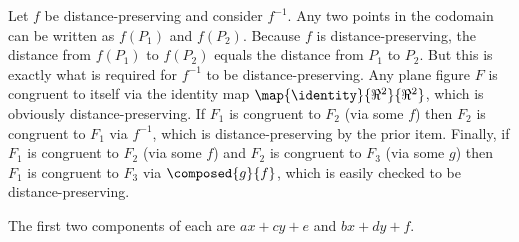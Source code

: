 \begin{ans}{3}
       \begin{exparts}
         \partsitem Let $f$ be distance-preserving and consider $f^{-1}$.
           Any two points in the codomain can be written as $f(P_1)$ and
           $f(P_2)$.
           Because $f$ is distance-preserving, the distance from $f(P_1)$
           to $f(P_2)$ equals the distance from $P_1$ to $P_2$.
           But this is exactly what is required for $f^{-1}$ to be
           distance-preserving.
         \partsitem Any plane figure $F$ is congruent to itself via the
           identity map $\map{\identity}{\Re^2}{\Re^2}$, which is obviously
           distance-preserving.
           If $F_1$ is congruent to $F_2$ (via some $f$) then
           $F_2$ is congruent to $F_1$ via $f^{-1}$, which is
           distance-preserving by the prior item.
           Finally, if $F_1$ is congruent to $F_2$ (via some $f$) and
           $F_2$ is congruent to $F_3$ (via some $g$) then $F_1$ is
           congruent to $F_3$ via $\composed{g}{f}$, which is easily checked
           to be distance-preserving.
       \end{exparts}
     
\end{ans}
\begin{ans}{4}
       The first two components of each are $ax+cy+e$ and $bx+dy+f$.
     
\end{ans}
